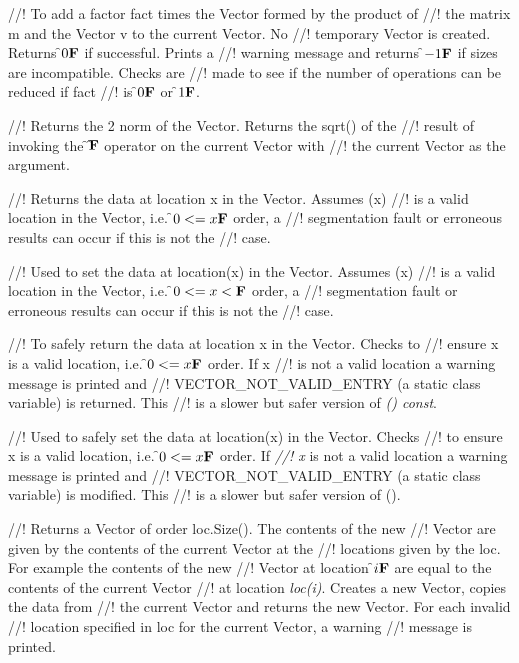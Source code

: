 //! To add a factor \p fact times the Vector formed by the product of
//! the matrix \p m and the Vector \p v to the current Vector. No
//! temporary Vector is created. Returns \f$0{\bf F}$ if successful. Prints a
//! warning message and returns \f$-1{\bf F}$ if sizes are incompatible. Checks are
//! made to see if the number of operations can be reduced if \p fact
//! is \f$0{\bf F}$ or \f$1{\bf F}$. 


//! Returns the 2 norm of the Vector. Returns the sqrt() of the
//! result of invoking the \f$\hat{ }{\bf F}$ operator on the current Vector with
//! the current Vector as the argument. 

//! Returns the data at location \p x in the Vector. Assumes (\p x) 
//! is a valid location in the Vector, i.e. \f$0 <= x {\bf F}$ order, a
//! segmentation fault or erroneous results can occur if this is not the 
//! case. 

//! Used to set the data at location(\p x) in the Vector. Assumes (\p x)
//! is a valid location in the Vector, i.e. \f$0 <= x < {\bf F}$ order, a
//! segmentation fault or erroneous results can occur if this is not the
//! case. 

//! To safely return the data at location \p x in the Vector. Checks to
//! ensure \p x is a valid location, i.e. \f$0 <= x {\bf F}$ order. If \p x
//! is not a valid location a warning message is printed and
//! VECTOR\_NOT\_VALID\_ENTRY (a static class variable) is returned. This
//! is a slower but safer version of {\em () const}. 

//! Used to safely set the data at location(\p x) in the Vector. Checks
//! to ensure \p x is a valid location, i.e. \f$0 <= x {\bf F}$ order. If {\em
//! x} is not a valid location a warning message is printed and
//! VECTOR\_NOT\_VALID\_ENTRY (a static class variable) is modified. This
//! is a slower but safer version of (). 

//! Returns a Vector of order loc.Size(). The contents of the new
//! Vector are given by the contents of the current Vector at the
//! locations given by the \p loc. For example the contents of the new
//! Vector at location \f$i{\bf F}$ are equal to the contents of the current Vector
//! at location {\em loc(i)}. Creates a new Vector, copies the data from
//! the current Vector and returns the new Vector. For each invalid
//! location specified in \p loc for the current Vector, a warning
//! message is printed. 

